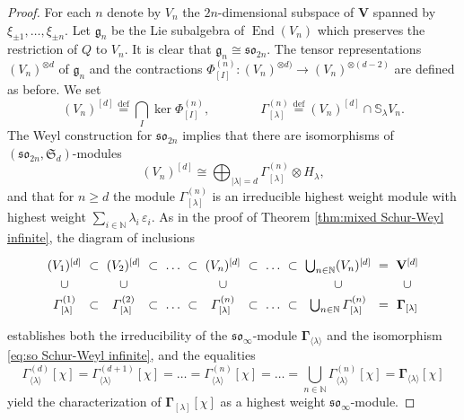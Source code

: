 \documentclass[12pt,reqno]{amsart}
\numberwithin{equation}{section}
\theoremstyle{plain}
\theoremstyle{definition}
\def\N{\mathbb N}
\def\eps{\varepsilon}
\def\bydef{\overset{\mathrm {def}}=}
\def\so{\mathfrak{so}}
\DeclareMathOperator{\End}{End} %
\def\o{\otimes}
\def\g{\mathfrak g}
\def\spV_#1{\boldsymbol\Gamma_{\<#1\>}}
\def\soV_#1{\boldsymbol\Gamma_{[#1]}}
\def\SS{\mathbb S}
\def\VV{\mathbf V}
\def\<{\langle}
\def\>{\rangle}
\begin{document}
\begin{proof}
For each $n$ denote by $V_{n}$ the $2n$-dimensional subspace of
$\VV$ spanned by $\xi_{\pm 1},\dots,\xi_{\pm n}$. Let $\g_n$ be the Lie subalgebra of $\End(V_n)$ which preserves the restriction
of $Q$ to $V_{n}$. It is clear that $\g_n \cong \so_{2n}$. The
tensor representations $(V_{n})^{\o d}$ of $\g_n$ and the
contractions $\Phi_{[I]}^{(n)}: (V_{n})^{\o d)} \to
(V_{n})^{\o(d-2)}$ are defined as before. We set
\begin{equation*}
    (V_{n})^{[d]} \bydef \bigcap_{I} \ker \Phi_{[I]}^{(n)},
    \qquad\qquad
    \varGamma_{[\lambda]}^{(n)} \bydef  (V_{n})^{ [d] } \cap \SS_\lambda V_{n}.
\end{equation*}
The Weyl construction for $\so_{2n}$ implies that there are isomorphisms of $(\so_{2n},\mathfrak S_d)$-modules
\begin{equation}\label{eq:so Schur-Weyl finite}
    (V_n)^{[d]} \cong \bigoplus_{|\lambda|=d}
    \varGamma_{[\lambda]}^{(n)} \o H_\lambda,
\end{equation}
and that for $n\ge d$ the module $\varGamma_{[\lambda]}^{(n)}$ is
an irreducible highest weight module with highest weight $\sum_{i
\in \N} \lambda_i \, \eps_i$. As in the proof of Theorem
\ref{thm:mixed Schur-Weyl infinite}, the diagram of inclusions
\begin{equation}\label{eq:exhaustions so}
\begin{gathered}\xymatrix@C=0pt@R=0pt{
    (V_1)^{[d]} & \subset & (V_2)^{[d]} & \subset &\dots &\subset &(V_n)^{[d]}
    &\subset &\dots &\subset  &\bigcup_{n\in\N} (V_n)^{ [d] } & = & \VV^{[d]}
    \\
    \cup &&      \cup &&     &&     \cup &&     &&     \cup &&    \cup
    \\
    \varGamma_{[\lambda]}^{(1)} & \subset & \varGamma_{[\lambda]}^{(2)} &\subset &\dots &\subset &\varGamma_{[\lambda]}^{(n)}
    &\subset &\dots &\subset &\bigcup_{n\in\N} \varGamma_{[\lambda]}^{(n)} & = & \soV_{\lambda}
    }
\end{gathered}
\end{equation}
establishes both the irreducibility of the $\so_\infty$-module
$\spV_{\lambda}$ and the isomorphism \eqref{eq:so Schur-Weyl
infinite}, and the equalities
\begin{equation*}
    \varGamma_{\<\lambda\>}^{(d)}[\chi] = \varGamma_{\<\lambda\>}^{(d+1)}[\chi]=
    \dots = \varGamma_{\<\lambda\>}^{(n)}[\chi] = \dots = \bigcup_{n\in\N} \varGamma_{\<\lambda\>}^{(n)}[\chi] = \spV_{\lambda}[\chi]
\end{equation*}
yield the characterization of $\soV_{\lambda}[\chi]$ as a highest weight $\so_\infty$-module.
\end{proof}
\end{document}
